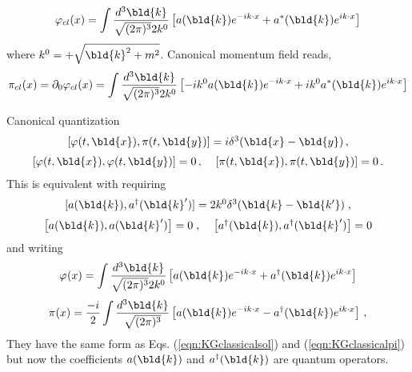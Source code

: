 \begin{equation}
\varphi_{cl}(x) = \int \frac{d^3 \bld{k}}{\sqrt{(2\pi)^3}2k^0} \left[
a(\bld{k}) e^{-i k \cdot x} + a^*(\bld{k})e^{i k \cdot x} \right]
\label{eqn:KGclassicalsol}
\end{equation}
where $k^0 = + \sqrt{\bld{k}^2 + m^2}$. 
Canonical momentum field reads,
\begin{equation}
\pi_{cl}(x) = \partial_0 \varphi_{cl}(x)
=
\int \frac{d^3 \bld{k}}{\sqrt{(2\pi)^3}2k^0}  \left[
- i k^0 a(\bld{k}) e^{-i k \cdot x} + i k^0 a^*(\bld{k})e^{i k \cdot x} \right]
\label{eqn:KGclassicalpi}
\end{equation}


Canonical quantization
\begin{equation}
\begin{array}{c}
[ \varphi(t,\bld{x}), \pi(t, \bld{y})] = i \delta^3 (\bld{x} - \bld{y} )\,,
\vspace{2mm}
\\
\left[ \varphi(t,\bld{x}), \varphi(t,\bld{y}) \right] = 0\,,
\;\;\;\;\left[ \pi(t,\bld{x}), \pi(t,\bld{y}) \right] = 0\,.
\end{array}
\label{eqn:cancomm_eqtime_RS}
\end{equation}
This is equivalent with requiring 
\begin{equation}
\begin{array}{c}
[ a(\bld{k}), a^\dagger(\bld{k}')] = 2k^0 \delta^3 (\bld{k} - \bld{k'} )\;,
\vspace{2mm}
\\
\left[ a(\bld{k}), a(\bld{k}') \right] = 0\;,\;\;\;\;\left[ a^\dagger(\bld{k}), a^\dagger(\bld{k}') \right] = 0
\end{array}
\label{eqn:cancomm_RS}
\end{equation}
and writing
\begin{equation}
\varphi_{}(x) = \int \frac{d^3 \bld{k}}{\sqrt{(2\pi)^3}2k^0} \left[
a(\bld{k}) e^{-i k \cdot x} + a^\dagger(\bld{k})e^{i k \cdot x} \right]
\label{eqn:RS_fieldexpansion}
\end{equation}
\begin{equation}
\pi_{}(x) 
=
\frac{-i}{2}
\int \frac{d^3 \bld{k}}{\sqrt{(2\pi)^3}}  \left[
a(\bld{k}) e^{-i k \cdot x} - a^\dagger(\bld{k})e^{i k \cdot x} \right]\,,
\label{eqn:RS_pifieldexpansion}
\end{equation}
They have the same form as Eqs. (\ref{eqn:KGclassicalsol}) and (\ref{eqn:KGclassicalpi})
but now the coefficients $a(\bld{k})$ and $a^\dagger(\bld{k})$ are
quantum operators.

